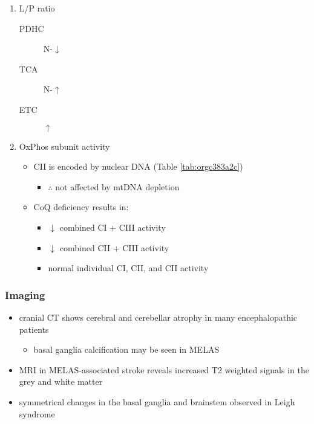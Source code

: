 \documentclass[12pt]{scrartcl}
\begin{document}
\begin{enumerate}
\item L/P ratio
\label{sec:org4f458fb}
\begin{description}
\item[{PDHC}] N-\(\downarrow\)
\item[{TCA}] N-\(\uparrow\)
\item[{ETC}] \(\uparrow\)
\end{description}
\item OxPhos subunit activity
\label{sec:orgbe6aff8}
\begin{itemize}
\item CII is encoded by nuclear DNA (Table \ref{tab:orgc383a2c})
\begin{itemize}
\item \(\therefore\) not affected by mtDNA depletion
\end{itemize}
\item CoQ deficiency results in:
\begin{itemize}
\item \(\downarrow\) combined CI + CIII activity
\item \(\downarrow\) combined CII + CIII activity
\item normal individual CI, CII, and CII activity
\end{itemize}
\end{itemize}
\end{enumerate}

\subsubsection{Imaging}
\label{sec:orgf758c4a}
\begin{itemize}
\item cranial CT shows cerebral and cerebellar atrophy in many encephalopathic patients
\begin{itemize}
\item basal ganglia calcification may be seen in MELAS
\end{itemize}
\item MRI in MELAS-associated stroke reveals increased T2 weighted signals in the grey and white matter
\item symmetrical changes in the basal ganglia and brainstem observed in Leigh syndrome
\end{itemize}
\end{document}
